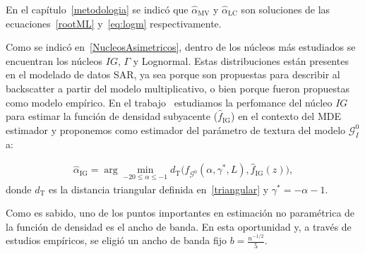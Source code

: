 En el capítulo~\ref{metodologia} se indicó que $\widehat{\alpha}_\text{MV}$ y $\widehat{\alpha}_\text{LC}$ son soluciones de las ecuaciones~\ref{rootML} y~\ref{eq:logm} respectivamente.


Como se indicó en~\ref{NucleosAsimetricos}, dentro de los núcleos más estudiados se encuentran los núcleos $IG$, $\Gamma$ y Lognormal. Estas distribuciones están presentes en el modelado de datos SAR, ya sea porque son propuestas para describir al backscatter a partir del modelo multiplicativo, o bien porque fueron propuestas como modelo empírico. En el trabajo~\cite{gambini2015} estudiamos la perfomance del núcleo $IG$ para estimar la función de densidad subyacente ($\widehat f_\text{IG}$) en el contexto del MDE estimador y proponemos como estimador del parámetro de textura del modelo $\mathcal{G}_I^0$ a:

\begin{align}
\widehat{\alpha}_{\text{IG}}= \arg\min_{-20\leq \alpha \leq -1} d_{\text{T}}\big(f_{\mathcal{G}^{0}}(\alpha,\gamma^*, L ), \widehat f_\text{IG}(z)\big),
\label{minimization}
\end{align}
donde $d_{\text{T}}$ es la distancia triangular definida en~\ref{triangular} y $\gamma^*=-\alpha-1$.  

Como es sabido, uno de los puntos importantes en estimación no paramétrica de la función de densidad es el ancho de banda. En esta oportunidad y, a través de estudios empíricos, se eligió un ancho de banda fijo $b=\frac{n^{-1/2}}{5}$.


